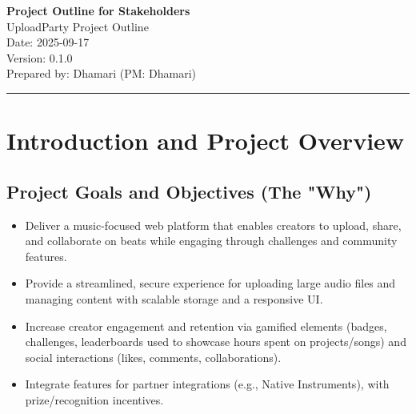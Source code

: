 \documentclass[12pt,a4paper]{article}
\begin{document}
\begin{center}
{\LARGE\bfseries Project Outline for Stakeholders}\\[1em]
{\large UploadParty Project Outline}\\[0.5em]
Date: 2025-09-17\\
Version: 0.1.0\\
Prepared by: Dhamari (PM: Dhamari)
\end{center}

\vspace{1em}
\noindent\rule{\textwidth}{1pt}

\section{Introduction and Project Overview}

\subsection{Project Goals and Objectives (The "Why")}
\begin{itemize}
\item Deliver a music-focused web platform that enables creators to upload, share, and collaborate on beats while engaging through challenges and community features.
\item Provide a streamlined, secure experience for uploading large audio files and managing content with scalable storage and a responsive UI.
\item Increase creator engagement and retention via gamified elements (badges, challenges, leaderboards used to showcase hours spent on projects/songs) and social interactions (likes, comments, collaborations).
\item Integrate features for partner integrations (e.g., Native Instruments), with prize/recognition incentives.
\end{itemize}
\end{document}
